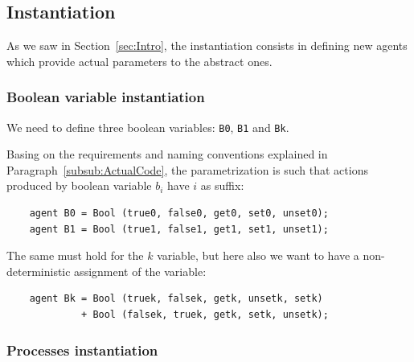\documentclass[10pt,a4paper]{article}
\newcommand{\Agent}[1]{{\tt {#1}}}
\begin{document}
    \subsection{Instantiation}
    \label{subsec:Instantiation}

        As we saw in Section~\ref{sec:Intro}, the instantiation consists
        in defining new agents which provide actual parameters to the
        abstract ones.

        \subsubsection{Boolean variable instantiation}

            We need to define three boolean variables: \Agent{B0},
            \Agent{B1} and \Agent{Bk}.

            Basing on the requirements and naming conventions explained in
            Paragraph~\ref{subsub:ActualCode}, the parametrization is such
            that actions produced by boolean variable $b_i$ have $i$ as
            suffix:
            \begin{verbatim}
    agent B0 = Bool (true0, false0, get0, set0, unset0);
    agent B1 = Bool (true1, false1, get1, set1, unset1);
            \end{verbatim}

            The same must hold for the $k$ variable, but here also we want to
            have a non-deterministic assignment of the variable:
            \begin{verbatim}
    agent Bk = Bool (truek, falsek, getk, unsetk, setk)
             + Bool (falsek, truek, getk, setk, unsetk);
            \end{verbatim}

        \subsubsection{Processes instantiation}
\end{document}
